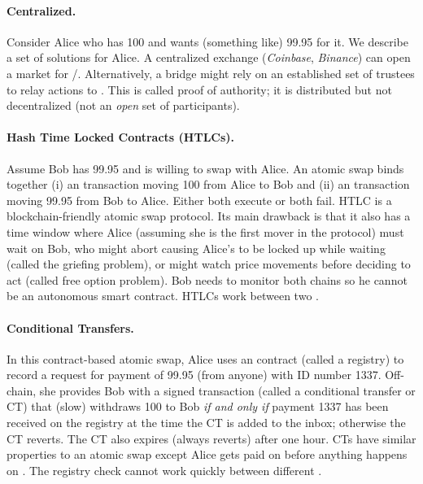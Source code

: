 \paragraph*{Centralized.} Consider Alice who has 100 \ethtwo and wants (something like) 99.95 \ethone for it. We describe a set of solutions for Alice. A centralized exchange (\eg \textit{Coinbase}, \textit{Binance}) can open a market for \ethtwo/\ethone. Alternatively, a bridge might rely on an established set of trustees to relay \layertwo actions to \layerone. This is called proof of authority; it is distributed but not decentralized (\ie not an \textit{open} set of participants).  

\paragraph*{Hash Time Locked Contracts (HTLCs).} Assume Bob has 99.95 \ethone and is willing to swap with Alice. An atomic swap binds together (i) an \layertwo transaction moving 100 \ethtwo from Alice to Bob and (ii) an \layerone transaction moving 99.95 \ethone from Bob to Alice. Either both execute or both fail. HTLC is a blockchain-friendly atomic swap protocol. Its main drawback is that it also has a time window where Alice (assuming she is the first mover in the protocol) must wait on Bob, who might abort causing Alice's \ethtwo to be locked up while waiting (called the griefing problem), or might watch price movements before deciding to act (called free option problem). Bob needs to monitor both chains so he cannot be an autonomous smart contract. HTLCs work between two \layertwos.

\paragraph*{Conditional Transfers.} In this contract-based atomic swap, Alice uses an \layerone contract (called a registry) to record a request for payment of 99.95 \ethone (from anyone) with ID number 1337. Off-chain, she provides Bob with a signed \layertwo transaction (called a conditional transfer or CT) that (slow) withdraws 100 \ethtwo to Bob \textit{if and only if} payment 1337 has been received on the \layerone registry at the time the CT is added to the inbox; otherwise the CT reverts. The CT also expires (always reverts) after one hour. CTs have similar properties to an atomic swap except Alice gets paid on \layerone before anything happens on \layertwo. The registry check cannot work quickly between different \layertwos. 

